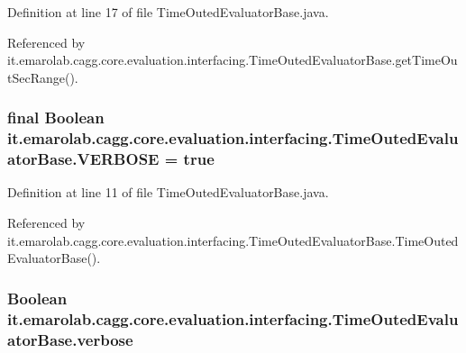 Definition at line 17 of file Time\-Outed\-Evaluator\-Base.\-java.



Referenced by it.\-emarolab.\-cagg.\-core.\-evaluation.\-interfacing.\-Time\-Outed\-Evaluator\-Base.\-get\-Time\-Out\-Sec\-Range().

\hypertarget{classit_1_1emarolab_1_1cagg_1_1core_1_1evaluation_1_1interfacing_1_1TimeOutedEvaluatorBase_a156e1c435d95cb605fe940a5b7d39bd0}{
\subsubsection[{V\-E\-R\-B\-O\-S\-E}]{\setlength{\rightskip}{0pt plus 5cm}final Boolean it.\-emarolab.\-cagg.\-core.\-evaluation.\-interfacing.\-Time\-Outed\-Evaluator\-Base.\-V\-E\-R\-B\-O\-S\-E = true\hspace{0.3cm}{\ttfamily [static]}}}\label{classit_1_1emarolab_1_1cagg_1_1core_1_1evaluation_1_1interfacing_1_1TimeOutedEvaluatorBase_a156e1c435d95cb605fe940a5b7d39bd0}


Definition at line 11 of file Time\-Outed\-Evaluator\-Base.\-java.



Referenced by it.\-emarolab.\-cagg.\-core.\-evaluation.\-interfacing.\-Time\-Outed\-Evaluator\-Base.\-Time\-Outed\-Evaluator\-Base().

\hypertarget{classit_1_1emarolab_1_1cagg_1_1core_1_1evaluation_1_1interfacing_1_1TimeOutedEvaluatorBase_a9001a1905c1aa9ae0b1fbd95551150fc}{
\subsubsection[{verbose}]{\setlength{\rightskip}{0pt plus 5cm}Boolean it.\-emarolab.\-cagg.\-core.\-evaluation.\-interfacing.\-Time\-Outed\-Evaluator\-Base.\-verbose\hspace{0.3cm}{\ttfamily [private]}}}\label{classit_1_1emarolab_1_1cagg_1_1core_1_1evaluation_1_1interfacing_1_1TimeOutedEvaluatorBase_a9001a1905c1aa9ae0b1fbd95551150fc}



